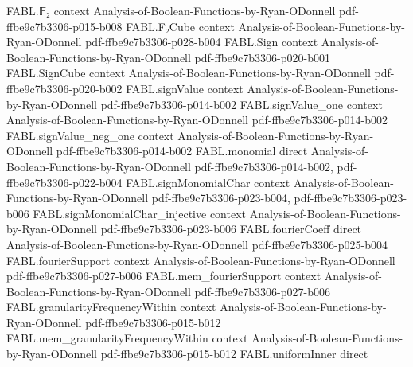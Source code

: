 \begin{theorem}
\label{FABL.allZeroStringTester_acceptanceProbability}
\leanok
{}
\proofstep
  {FABL.𝔽₂}
  {context}
  {Analysis-of-Boolean-Functions-by-Ryan-ODonnell}
  {pdf-ffbe9c7b3306-p015-b008}
\proofstep
  {FABL.F₂Cube}
  {context}
  {Analysis-of-Boolean-Functions-by-Ryan-ODonnell}
  {pdf-ffbe9c7b3306-p028-b004}
\proofstep
  {FABL.Sign}
  {context}
  {Analysis-of-Boolean-Functions-by-Ryan-ODonnell}
  {pdf-ffbe9c7b3306-p020-b001}
\proofstep
  {FABL.SignCube}
  {context}
  {Analysis-of-Boolean-Functions-by-Ryan-ODonnell}
  {pdf-ffbe9c7b3306-p020-b002}
\proofstep
  {FABL.signValue}
  {context}
  {Analysis-of-Boolean-Functions-by-Ryan-ODonnell}
  {pdf-ffbe9c7b3306-p014-b002}
\proofstep
  {FABL.signValue_one}
  {context}
  {Analysis-of-Boolean-Functions-by-Ryan-ODonnell}
  {pdf-ffbe9c7b3306-p014-b002}
\proofstep
  {FABL.signValue_neg_one}
  {context}
  {Analysis-of-Boolean-Functions-by-Ryan-ODonnell}
  {pdf-ffbe9c7b3306-p014-b002}
\proofstep
  {FABL.monomial}
  {direct}
  {Analysis-of-Boolean-Functions-by-Ryan-ODonnell}
  {pdf-ffbe9c7b3306-p014-b002,
    pdf-ffbe9c7b3306-p022-b004}
\proofstep
  {FABL.signMonomialChar}
  {context}
  {Analysis-of-Boolean-Functions-by-Ryan-ODonnell}
  {pdf-ffbe9c7b3306-p023-b004,
    pdf-ffbe9c7b3306-p023-b006}
\proofstep
  {FABL.signMonomialChar_injective}
  {context}
  {Analysis-of-Boolean-Functions-by-Ryan-ODonnell}
  {pdf-ffbe9c7b3306-p023-b006}
\proofstep
  {FABL.fourierCoeff}
  {direct}
  {Analysis-of-Boolean-Functions-by-Ryan-ODonnell}
  {pdf-ffbe9c7b3306-p025-b004}
\proofstep
  {FABL.fourierSupport}
  {context}
  {Analysis-of-Boolean-Functions-by-Ryan-ODonnell}
  {pdf-ffbe9c7b3306-p027-b006}
\proofstep
  {FABL.mem_fourierSupport}
  {context}
  {Analysis-of-Boolean-Functions-by-Ryan-ODonnell}
  {pdf-ffbe9c7b3306-p027-b006}
\proofstep
  {FABL.granularityFrequencyWithin}
  {context}
  {Analysis-of-Boolean-Functions-by-Ryan-ODonnell}
  {pdf-ffbe9c7b3306-p015-b012}
\proofstep
  {FABL.mem_granularityFrequencyWithin}
  {context}
  {Analysis-of-Boolean-Functions-by-Ryan-ODonnell}
  {pdf-ffbe9c7b3306-p015-b012}
\proofstep
  {FABL.uniformInner}
  {direct}

\end{theorem}

